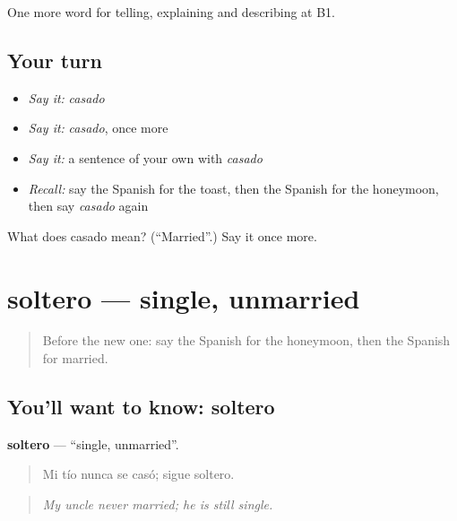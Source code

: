 \begin{grammarlens}[title={What you've built}]
One more word for telling, explaining and describing at B1.
\end{grammarlens}

\subsection*{Your turn}
\begin{itemize}
\raggedright
  \item \emph{Say it:} \emph{casado}
  \item \emph{Say it:} \emph{casado}, once more
  \item \emph{Say it:} a sentence of your own with \emph{casado}
  \item \emph{Recall:} say the Spanish for the toast, then the Spanish for the honeymoon, then say \emph{casado} again
\end{itemize}

\begin{tcolorbox}[breakable,colback=teal!4,colframe=teal!35!black,title={Before you move on}]
What does casado mean? (\textquotedblleft{}Married\textquotedblright{}.) Say it once more.
\end{tcolorbox}
\section[soltero]{soltero — single, unmarried}

\label{lesson:ES-C549-soltero}



\begin{quote}
Before the new one: say the Spanish for the honeymoon, then the Spanish for married.
\end{quote}

\subsection*{You'll want to know: soltero}
\textbf{soltero} — \textquotedblleft{}single, unmarried\textquotedblright{}.

\begin{quote}
Mi tío nunca se casó; sigue soltero.
\end{quote}

\begin{quote}
\emph{My uncle never married; he is still single.}
\end{quote}


